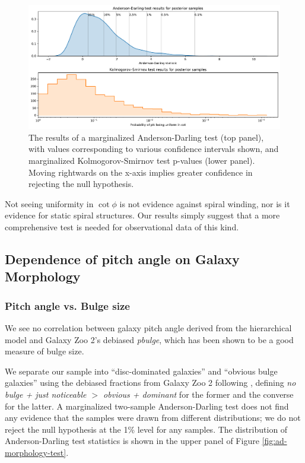 \begin{figure}
  \includegraphics[width=17.7cm]{plots/cot_uniform_marginalized_tests.pdf}
  \caption{The results of a marginalized Anderson-Darling test (top panel), with values corresponding to various confidence intervals shown, and marginalized Kolmogorov-Smirnov test p-values (lower panel). Moving rightwards on the x-axis implies greater confidence in rejecting the null hypothesis.}
  \label{fig:ad-cot-test}
\end{figure}

Not seeing uniformity in $\cot\phi$ is not evidence against spiral winding, nor is it evidence for static spiral structures. Our results simply suggest that a more comprehensive test is needed for observational data of this kind.


\subsection{Dependence of pitch angle on Galaxy Morphology}
\label{section:morphology_comparision}
\subsubsection{Pitch angle vs. Bulge size}
We see no correlation between galaxy pitch angle derived from the hierarchical model and Galaxy Zoo 2's debiased \citep{Willett2013:1308.3496v2} \textit{pbulge}, which has been shown to be a good measure of bulge size.

We separate our sample into ``disc-dominated galaxies'' and ``obvious bulge galaxies'' using the debiased fractions from Galaxy Zoo 2 following \citet{2017MNRAS.469.3363K}, defining \textit{no bulge + just noticeable $>$ obvious + dominant} for the former and the converse for the latter. A marginalized two-sample Anderson-Darling test \citep{doi:10.1080/01621459.1987.10478517} does not find any evidence that the samples were drawn from different distributions; we do not reject the null hypothesis at the 1\% level for any samples. The distribution of Anderson-Darling test statistics is shown in the upper panel of Figure \ref{fig:ad-morphology-test}.


